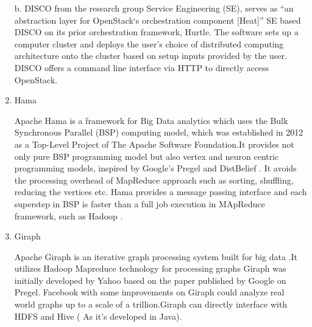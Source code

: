 \begin{enumerate}
b. DISCO from the research group Service Engineering (SE),
\label{\detokenize{i524/technologies:id290}}{\hyperref[\detokenize{i524/technologies:www-discoabout-discoabstractionlayer}]{\sphinxcrossref{{[}244{]}}}} serves as “an
abstraction layer for OpenStack‘s orchestration component {[}Heat{]}”
SE based DISCO on its prior orchestration framework, Hurtle. The
software sets up a computer cluster and deploys the user’s choice
of distributed computing architecture onto the cluster based on
setup inputs provided by the user. DISCO offers a command line
interface via HTTP to directly access
OpenStack. \label{\detokenize{i524/technologies:id291}}{\hyperref[\detokenize{i524/technologies:www-discodescribed-discoabstractionlayer}]{\sphinxcrossref{{[}245{]}}}}

\item {} 
Hama

Apache Hama is a framework for Big Data analytics which uses the
Bulk Synchronous Parallel (BSP) computing model, which was
established in 2012 as a Top-Level Project of The Apache Software
Foundation.It provides not only pure BSP programming model but
also vertex and neuron centric programming models, inspired by
Google's Pregel and DistBelief \label{\detokenize{i524/technologies:id292}}{\hyperref[\detokenize{i524/technologies:apache-hama}]{\sphinxcrossref{{[}246{]}}}}. It avoids the
processing overhead of MapReduce approach such as sorting,
shuffling, reducing the vertices etc. Hama provides a message
passing interface and each superstep in BSP is faster than a full
job execution in MApReduce framework, such as Hadoop
\label{\detokenize{i524/technologies:id293}}{\hyperref[\detokenize{i524/technologies:book-hama}]{\sphinxcrossref{{[}247{]}}}}.

\item {} 
Giraph

Apache Giraph is an iterative graph processing system built for big
data \label{\detokenize{i524/technologies:id294}}{\hyperref[\detokenize{i524/technologies:www-giraph-apache}]{\sphinxcrossref{{[}248{]}}}}.It utilizes Hadoop Mapreduce
technology for processing graphs \label{\detokenize{i524/technologies:id295}}{\hyperref[\detokenize{i524/technologies:www-apache-giraph-wiki}]{\sphinxcrossref{{[}249{]}}}}
Giraph was initially developed by Yahoo based on the paper
published by Google on Pregel. \label{\detokenize{i524/technologies:id296}}{\hyperref[\detokenize{i524/technologies:www-apache-giraph-pcworld}]{\sphinxcrossref{{[}250{]}}}}
Facebook with some improvements on Giraph could analyze real world
graphs up to a scale of a trillion.Giraph can directly interface
with HDFS and Hive ( As it's developed in
Java). \label{\detokenize{i524/technologies:id297}}{\hyperref[\detokenize{i524/technologies:www-apache-giraph-fb}]{\sphinxcrossref{{[}251{]}}}}


\end{enumerate}
